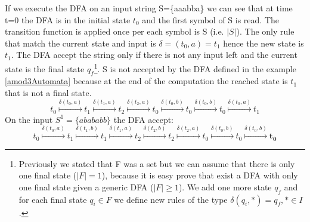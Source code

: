 If we execute the DFA on an input string S=\{aaabba\} we can see that at time
t=0 the DFA is in the initial state \begin{math}t_0\end{math} and the first
symbol of S is read.
The transition function is applied once per each symbol is S
(i.e. \begin{math}\left\vert{S}\right\vert\end{math}). The only rule that match 
the current state and input is \begin{math}\delta=(t_0,a)=t_1 \end{math} hence the
new state is \begin{math}t_1\end{math}. The DFA accept the string only if  there
is not any input left and the current state is the final state
\begin{math}q_f\end{math}\footnote{Previously we stated that F was a set but
we can assume that there is only one final state
(\begin{math}\left\vert{F}\right\vert=1\end{math}), because it is easy prove
that exist a DFA with only one final state given a generic DFA
(\begin{math}\left\vert{F}\right\vert \geq 1\end{math}). We add one more state
\begin{math}q_f\end{math} and for each final state \begin{math}q_i \in
F\end{math} we define new rules of the type \begin{math}\delta(q_i,*)=q_f, * \in I \end{math}.}.
S is not accepted by the DFA defined in the example \ref{amod3Automata} because
at the end of the computation the reached state is \begin{math}t_1\end{math}
that is not a final state.
 \[
 t_0\overset{\delta(t_0,a)}
 {\longmapsto}t_{1}\overset{\delta(t_1,a)}
 {\longmapsto}t_{2}\overset{\delta(t_2,a)}
 {\longmapsto} t_{0}\overset{\delta(t_0,b)}
 {\longmapsto}t_{0}\overset{\delta(t_0,b)}
 {\longmapsto}t_{0}\overset{\delta(t_0,a)}
 {\longmapsto} t_{1}
\]
On the input \begin{math}S^1=\{abababb\}\end{math} the DFA accept:
 \[
 t_0\overset{\delta(t_0,a)}
 {\longmapsto}t_{1}\overset{\delta(t_1,b)}
 {\longmapsto}t_{1}\overset{\delta(t_1,a)}
 {\longmapsto} t_{2}\overset{\delta(t_2,b)}
 {\longmapsto}t_{2}\overset{\delta(t_2,a)}
 {\longmapsto}t_{0}\overset{\delta(t_0,b)}
 {\longmapsto}t_{0}\overset{\delta(t_0,b)}
 {\longmapsto}\mathbf{t_{0}}
\]
